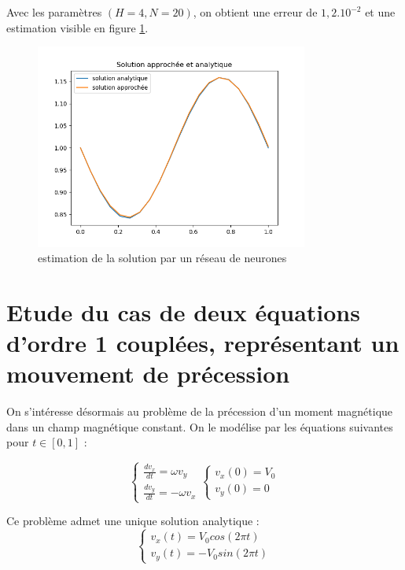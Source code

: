 \documentclass{article}
\begin{document}
Avec les paramètres $(H=4, N=20)$, on obtient une erreur de $1,2.10^{-2}$ et une estimation visible en figure \ref{fig:resultat_NN}.

\begin{figure}
\centering
\includegraphics[width=0.8\textwidth]{resultat_NN.png}
\caption{\label{fig:resultat_NN}estimation de la solution par un réseau de neurones}
\end{figure}


\section{Etude du cas de deux équations d'ordre 1 couplées, représentant un mouvement de précession}
On s'intéresse désormais au problème de la précession d'un moment magnétique dans un champ magnétique constant. On le modélise par les équations suivantes pour $t\in [0,1]$ :

\begin{equation}
\left\{
    \begin{array}{ll}
        \frac{dv_x}{dt} = \omega v_y \\
        \frac{dv_y}{dt} = -\omega v_x
    \end{array}
\right.
\left\{
    \begin{array}{ll}
        v_x(0) = V_0 \\
        v_y(0) = 0
    \end{array}
\right.
\label{eq:équations couplées}
\end{equation}

Ce problème admet une unique solution analytique :
\begin{equation}
\left\{
    \begin{array}{ll}
        v_x(t) = V_0 cos(2\pi t) \\
        v_y(t) = -V_0 sin(2\pi t)
    \end{array}
\right.
\label{eq:solution analytique couplée}
\end{equation}
\end{document}

